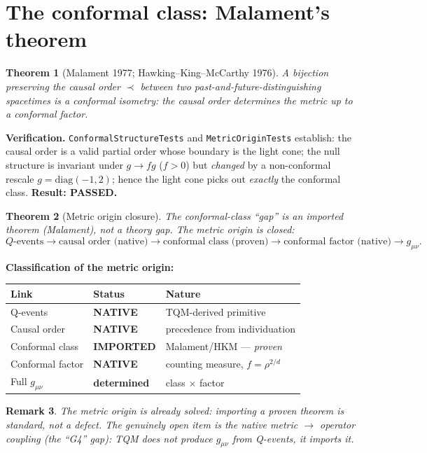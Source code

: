 \documentclass[11pt,twoside]{book}
\newtheorem{theorem}{Theorem}[chapter]
\newtheorem{remark}[theorem]{Remark}
\begin{document}
\section{The conformal class: Malament's theorem}

\begin{theorem}[Malament 1977; Hawking--King--McCarthy 1976]
A bijection preserving the causal order $\prec$ between two past-and-future-distinguishing
spacetimes is a conformal isometry: the causal order determines the metric \emph{up to a
conformal factor}.
\end{theorem}

\textbf{Verification.} \texttt{ConformalStructureTests} and \texttt{MetricOriginTests}
establish: the causal order is a valid partial order whose boundary is the light cone; the
null structure is invariant under $g\to f g$ ($f>0$) but \emph{changed} by a non-conformal
rescale $g=\mathrm{diag}(-1,2)$; hence the light cone picks out \emph{exactly} the
conformal class. \textbf{Result: PASSED.}

\begin{theorem}[Metric origin closure]
The conformal-class ``gap'' is an \emph{imported theorem} (Malament), not a theory gap.
The metric origin is closed:
\begin{equation}
Q\text{-events} \to \text{causal order (native)}
\to \text{conformal class (proven)}
\to \text{conformal factor (native)}
\to g_{\mu\nu}.
\end{equation}
\end{theorem}

\textbf{Classification of the metric origin:}

\begin{center}
\begin{tabular}{lll}
\toprule
Link & Status & Nature \\
\midrule
Q-events & \textbf{NATIVE} & TQM-derived primitive \\
Causal order & \textbf{NATIVE} & precedence from individuation \\
Conformal class & \textbf{IMPORTED} & Malament/HKM — \emph{proven} \\
Conformal factor & \textbf{NATIVE} & counting measure, $f=\rho^{2/d}$ \\
Full $g_{\mu\nu}$ & \textbf{determined} & class $\times$ factor \\
\bottomrule
\end{tabular}
\end{center}

\begin{remark}
The metric origin is \emph{already solved}: importing a proven theorem is standard, not a
defect. The genuinely open item is the \emph{native} metric $\to$ operator coupling
(the ``G4'' gap): TQM does not produce $g_{\mu\nu}$ from Q-events, it imports it.
\end{remark}
\end{document}
